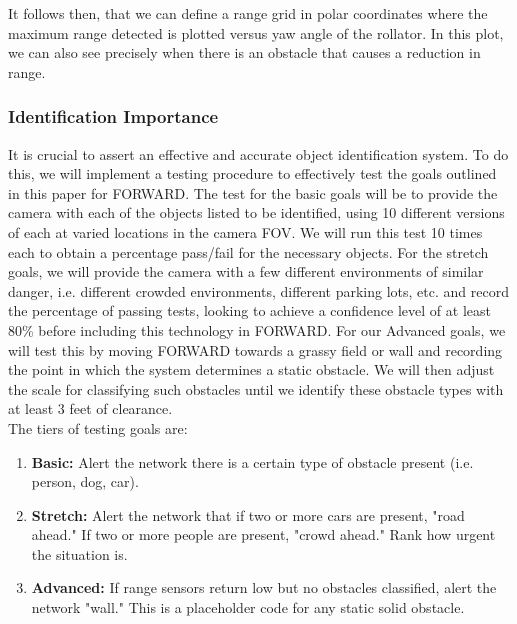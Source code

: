 
\noindent It follows then, that we can define a range grid in polar coordinates where the maximum range detected is plotted versus yaw angle of the rollator. In this plot, we can also see precisely when there is an obstacle that causes a reduction in range.

\subsubsection{Identification Importance}
\noindent It is crucial to assert an effective and accurate object identification system. To do this, we will implement a testing procedure to effectively test the goals outlined in this paper for FORWARD. The test for the basic goals will be to provide the camera with each of the objects listed to be identified, using 10 different versions of each at varied locations in the camera FOV. We will run this test 10 times each to obtain a percentage pass/fail for the necessary objects. For the stretch goals, we will provide the camera with a few different environments of similar danger, i.e. different crowded environments, different parking lots, etc. and record the percentage of passing tests, looking to achieve a confidence level of at least 80\% before including this technology in FORWARD. For our Advanced goals, we will test this by moving FORWARD towards a grassy field or wall and recording the point in which the system determines a static obstacle. We will then adjust the scale for classifying such obstacles until we identify these obstacle types with at least 3 feet of clearance. \\

The tiers of testing goals are:
\begin{enumerate}
	\item \textbf{Basic:} Alert the network there is a certain type of obstacle present (i.e. person, dog, car).
	\item \textbf{Stretch:} Alert the network that if two or more cars are present, "road ahead." If two or more people are present, "crowd ahead." Rank how urgent the situation is.
	\item \textbf{Advanced:} If range sensors return low but no obstacles classified, alert the network "wall." This is a placeholder code for any static solid obstacle.
\end{enumerate}


